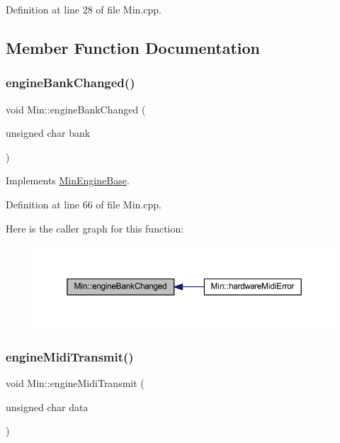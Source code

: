 Definition at line 28 of file Min.\+cpp.



\subsection{Member Function Documentation}
\mbox{\label{class_min_a24ca9b52ba9755b458f6141d730bb9b1}} 
\subsubsection{\texorpdfstring{engine\+Bank\+Changed()}{engineBankChanged()}}
{\footnotesize\ttfamily void Min\+::engine\+Bank\+Changed (\begin{DoxyParamCaption}\item[{unsigned char}]{bank }\end{DoxyParamCaption})\hspace{0.3cm}{\ttfamily [virtual]}}



Implements \hyperlink{class_min_engine_base_a7c1b890b5c7f0004969304880aaaf563}{Min\+Engine\+Base}.



Definition at line 66 of file Min.\+cpp.

Here is the caller graph for this function\+:
\nopagebreak
\begin{figure}[H]
\begin{center}
\leavevmode
\includegraphics[width=350pt]{dd/d34/class_min_a24ca9b52ba9755b458f6141d730bb9b1_icgraph}
\end{center}
\end{figure}
\mbox{\label{class_min_a4b150119664bd46bd2a80561862ff666}} 
\subsubsection{\texorpdfstring{engine\+Midi\+Transmit()}{engineMidiTransmit()}}
{\footnotesize\ttfamily void Min\+::engine\+Midi\+Transmit (\begin{DoxyParamCaption}\item[{unsigned char}]{data }\end{DoxyParamCaption})\hspace{0.3cm}{\ttfamily [virtual]}}



